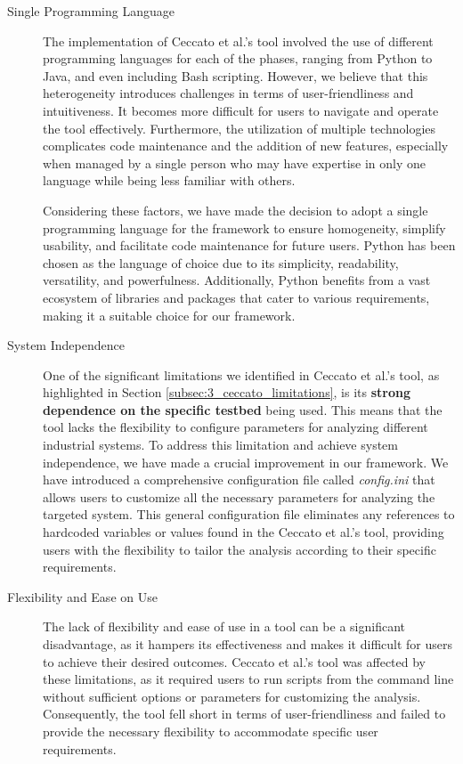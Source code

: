 \begin{description}
	\item[Single Programming Language] The implementation of Ceccato et al.'s tool involved the use of different programming languages for each of the phases, ranging from Python to Java, and even including Bash scripting.\newline
	However, we believe that this heterogeneity introduces challenges in terms of user-friendliness and intuitiveness. It becomes more difficult for users to navigate and operate the tool effectively. Furthermore, the utilization of multiple technologies complicates code maintenance and the addition of new features, especially when managed by a single person who may have expertise in only one language while being less familiar with others.
	
	\bigskip
	Considering these factors, we have made the decision to adopt a single programming language for the framework to ensure homogeneity, simplify usability, and facilitate code maintenance for future users. Python has been chosen as the language of choice due to its simplicity, readability, versatility, and powerfulness. Additionally, Python benefits from a vast ecosystem of libraries and packages that cater to various requirements, making it a suitable choice for our framework.
	
	\item[System Independence] One of the significant limitations we identified in Ceccato et al.'s tool, as highlighted in Section \ref{subsec:3_ceccato_limitations}, is its \textbf{strong dependence on the specific testbed} being used. This means that the tool lacks the flexibility to configure parameters for analyzing different industrial systems.\newline
	To address this limitation and achieve system independence, we have made a crucial improvement in our framework. We have introduced a comprehensive configuration file called \textit{config.ini} that allows users to customize all the necessary parameters for analyzing the targeted system. This general configuration file eliminates any references to hardcoded variables or values found in the Ceccato et al.'s tool, providing users with the flexibility to tailor the analysis according to their specific requirements.
	
	\item[Flexibility and Ease on Use] The lack of flexibility and ease of use in a tool can be a significant disadvantage, as it hampers its effectiveness and makes it difficult for users to achieve their desired outcomes. Ceccato et al.'s tool was affected by these limitations, as it required users to run scripts from the command line without sufficient options or parameters for customizing the analysis. Consequently, the tool fell short in terms of user-friendliness and failed to provide the necessary flexibility to accommodate specific user requirements.
	

\end{description}
